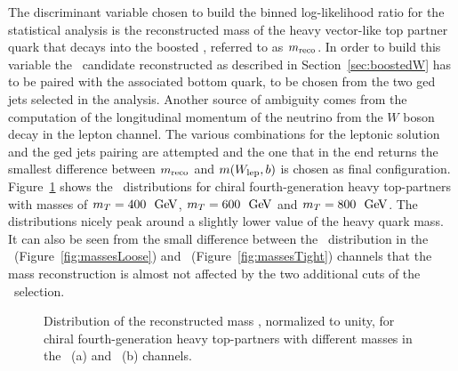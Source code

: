 The discriminant variable chosen to build the binned log-likelihood ratio
for the statistical analysis is the reconstructed mass of the
heavy vector-like top partner quark that decays into the boosted \whad, 
referred to as $m_{\rm reco}$. In order to build this variable the \whad\ 
candidate reconstructed as described in Section~\ref{sec:boostedW} has to
be paired with the associated bottom quark, to be chosen from the two
\btag ged jets selected in the analysis.
Another source of ambiguity comes from the computation of the longitudinal
momentum of the neutrino from the $W$ boson decay in the lepton channel.
The various combinations for the leptonic solution and the \btag ged jets
pairing are attempted and the one that in the end returns
the smallest difference between $m_{\rm reco}$ and $m(\wlep,b)$ is chosen
as final configuration. Figure~\ref{fig:masses} shows the \mreco\ distributions
for chiral fourth-generation heavy top-partners with masses of $m_T = 400~\gev$,
$m_T = 600~\gev$ and $m_T = 800~\gev$. The distributions nicely peak around a slightly
lower value of the heavy quark mass. It can also be seen from the small difference
between the \mreco\ distribution in the \loose\ (Figure~\ref{fig:massesLoose})
and \tight\ (Figure~\ref{fig:massesTight}) channels that the mass reconstruction
is almost not affected by the two additional cuts of the \tight\ selection.
\begin{figure}[h!tb]\begin{center}
	\caption{Distribution of the reconstructed mass \mreco, normalized to unity,
        for chiral fourth-generation heavy top-partners with different masses in the \loose\ (a)
        and \tight\ (b) channels.\label{fig:masses}}
\end{center}\end{figure}
